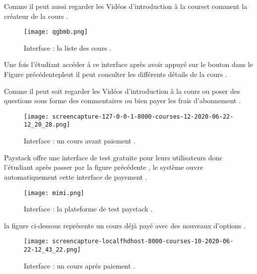 \medskip

Comme  il peut aussi regarder les Vidéos d'introduction à la courset comment la créateur de la cours .
\bigskip
\bigskip
\bigskip
\begin{figure}[ht]
	\centering
	\texttt{[image: qgbmb.png]}
	\caption{Interface : la liste des cours .}
	\label{fig:Interface : la liste des cours }
\end{figure}
\FloatBarrier
\bigskip
\bigskip
\bigskip
Une fois l'étudiant accéder  à ce interface  après avoir appuyé sur le bouton dans le Figure précédentepleut il peut consulter les différents détails de la cours .

\medskip

 Comme il peut soit regarder les Vidéos d'introduction à la cours ou poser des questions sous forme des commentaires  ou bien payer les frais d'abonnement .
\begin{figure}[ht]
	\centering
	\texttt{[image: screencapture-127-0-0-1-8000-courses-12-2020-06-22-12\_20\_28.png]}
	\caption{Interface : un cours avant paiement .}
	\label{fig:Interface :un cours avant paiement }
\end{figure}
\FloatBarrier
Paystack offre une interface de test gratuite pour leurs utilisateurs
donc l'étudiant après passer par la figure précédente , le système ouvre automatiquement cette interface de payement .
\begin{figure}[ht]
	\centering
	\texttt{[image: mimi.png]}
	\caption{Interface : la plateforme de test  paystack .}
	\label{fig:Interface : la plateforme de test  paystack }
\end{figure}
\FloatBarrier
la figure ci-dessous représente un cours déjà payé avec des nouveaux d'options .
\begin{figure}[ht]
	\centering
	\texttt{[image: screencapture-localfhdhost-8000-courses-10-2020-06-22-12\_43\_22.png]}
	\caption{Interface : un cours après paiement .}
	\label{fig:Interface :un cours après paiement }
\end{figure}
\FloatBarrier






